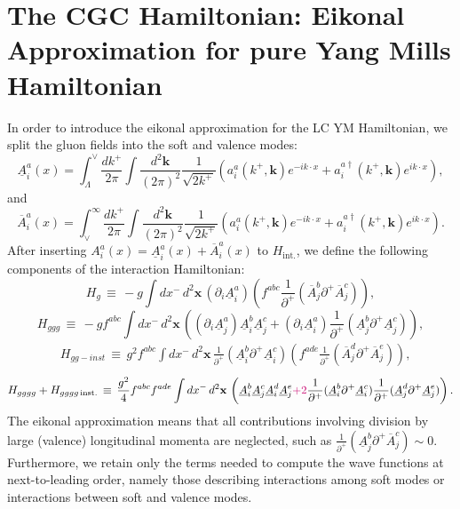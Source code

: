 \documentclass[a4paper,11pt]{article}
\begin{document}
\section{The CGC Hamiltonian: Eikonal Approximation for pure Yang Mills Hamiltonian} \label{sec:App2}
In order to introduce the eikonal approximation for the LC YM Hamiltonian, we split the gluon fields into  the soft and valence modes: 
\begin{equation}\label{Am}
\underline{A}_{i}^{a}(x)=\int_{\Lambda}^{\vee}\frac{dk^{+}}{2\pi}\int\frac{d^{2}\mathbf{k}}{(2\pi)^{2}}\frac{1}{\sqrt{2k^{+}}}\left(a_{i}^{a}(k^{+},\mathbf{k})e^{-ik\cdot x}+a_{i}^{a\dagger}(k^{+},\mathbf{k})e^{ik\cdot x}\right),
 \end{equation}
and
\begin{equation}\label{Ap}
\overline{A}_{i}^{a}(x)=\int_{\vee}^{\infty}\frac{dk^{+}}{2\pi}\int\frac{d^{2}\mathbf{k}}{(2\pi)^{2}}\frac{1}{\sqrt{2k^{+}}}\left(a_{i}^{a}(k^{+},\mathbf{k})e^{-ik\cdot x}+a_{i}^{a\dagger}(k^{+},\mathbf{k})e^{ik\cdot x}\right).
 \end{equation}
After inserting $A_{i}^{a}(x)=\underline{A}_{i}^{a}(x)+\overline{A}_{i}^{a}(x)$  to $H_{\text{int.}}$, we define the following components of the interaction Hamiltonian:
 \begin{equation}\label{Hg}
H_{g}\,\equiv\,-g\int dx^{-}\, d^{2}\mathbf{x}\,(\partial_{i}\underline{A}_{i}^{a})\left(f^{abc}\frac{1}{\partial^{+}}(\overline{A}_{j}^{b}\partial^{+}\overline{A}_{j}^{c})\right),
  \end{equation}
\begin{equation}\label{hggg}
H_{ggg}\,\equiv\,-gf^{abc}\int dx^{-}\, d^{2}\mathbf{x}\,\left((\partial_{i}\underline{A}_{j}^{a})\underline{A}_{i}^{b}\underline{A}_{j}^{c}+(\partial_{i}\underline{A}_{i}^{a})\frac{1}{\partial^{+}}(\underline{A}_{j}^{b}\partial^{+}\underline{A}_{j}^{c})\right),
 \end{equation}
  \begin{equation}\begin{split}\label{ggi}
&H_{gg-inst}\,\equiv\,g^{2}f^{abc}\int dx^{-}\, d^{2}\mathbf{x}\,\frac{1}{\partial^{+}}(\underline{A}_{i}^{b}\partial^{+}\underline{A}_{i}^{c})\left(f^{ade}\frac{1}{\partial^{+}}(\overline{A}_{j}^{d}\partial^{+}\overline{A}_{j}^{e})\right),
 \end{split}\end{equation}
 \begin{equation}H_{gggg}+H_{gggg\,\text{inst.}}\,\equiv\,\frac{g^{2}}{4}f^{abc}f^{ade}\int dx^{-}\, d^{2}\mathbf{x}\,\left(\underline{A}_{i}^{b}\underline{A}_{j}^{c}\underline{A}_{i}^{d}\underline{A}_{j}^{e}{\color{chg}+2}\frac{1}{\partial^{+}}(\underline{A}_{i}^{b}\partial^{+}\underline{A}_{i}^{c})\frac{1}{\partial^{+}}(\underline{A}_{j}^{d}\partial^{+}\underline{A}_{j}^{e})\right).
 \end{equation}
The eikonal approximation means that  all  contributions  involving division by large (valence) longitudinal momenta are neglected, such as $\frac{1}{\partial^{+}}(\underline{A}_{j}^{b}\partial^{+}\overline{A}_{j}^{c})\sim0$. 
Furthermore, we retain only the terms needed to compute the wave functions at next-to-leading order, namely those describing interactions among soft modes or interactions between soft and valence modes.
\end{document}
